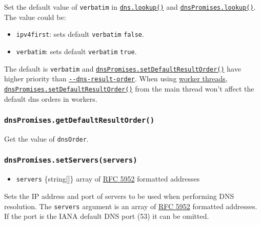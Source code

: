 Set the default value of \texttt{verbatim} in
\hyperref[dnslookuphostname-options-callback]{\texttt{dns.lookup()}} and
\hyperref[dnspromiseslookuphostname-options]{\texttt{dnsPromises.lookup()}}.
The value could be:

\begin{itemize}
\tightlist
\item
  \texttt{ipv4first}: sets default \texttt{verbatim} \texttt{false}.
\item
  \texttt{verbatim}: sets default \texttt{verbatim} \texttt{true}.
\end{itemize}

The default is \texttt{verbatim} and
\hyperref[dnspromisessetdefaultresultorderorder]{\texttt{dnsPromises.setDefaultResultOrder()}}
have higher priority than
\href{cli.md\#--dns-result-orderorder}{\texttt{-\/-dns-result-order}}.
When using \href{worker_threads.md}{worker threads},
\hyperref[dnspromisessetdefaultresultorderorder]{\texttt{dnsPromises.setDefaultResultOrder()}}
from the main thread won't affect the default dns orders in workers.

\subsubsection{\texorpdfstring{\texttt{dnsPromises.getDefaultResultOrder()}}{dnsPromises.getDefaultResultOrder()}}\label{dnspromises.getdefaultresultorder}

Get the value of \texttt{dnsOrder}.

\subsubsection{\texorpdfstring{\texttt{dnsPromises.setServers(servers)}}{dnsPromises.setServers(servers)}}\label{dnspromises.setserversservers}

\begin{itemize}
\tightlist
\item
  \texttt{servers} \{string{[}{]}\} array of
  \href{https://tools.ietf.org/html/rfc5952\#section-6}{RFC 5952}
  formatted addresses
\end{itemize}

Sets the IP address and port of servers to be used when performing DNS
resolution. The \texttt{servers} argument is an array of
\href{https://tools.ietf.org/html/rfc5952\#section-6}{RFC 5952}
formatted addresses. If the port is the IANA default DNS port (53) it
can be omitted.

\begin{Shaded}
\begin{Highlighting}[]
\NormalTok{([}
  \OperatorTok{,}
  \StringTok{\textquotesingle{}[2001:4860:4860::8888]\textquotesingle{}}\OperatorTok{,}
  \OperatorTok{,}
  \StringTok{\textquotesingle{}[2001:4860:4860::8888]:1053\textquotesingle{}}\OperatorTok{,}
\NormalTok{])}\OperatorTok{;}
\end{Highlighting}
\end{Shaded}

